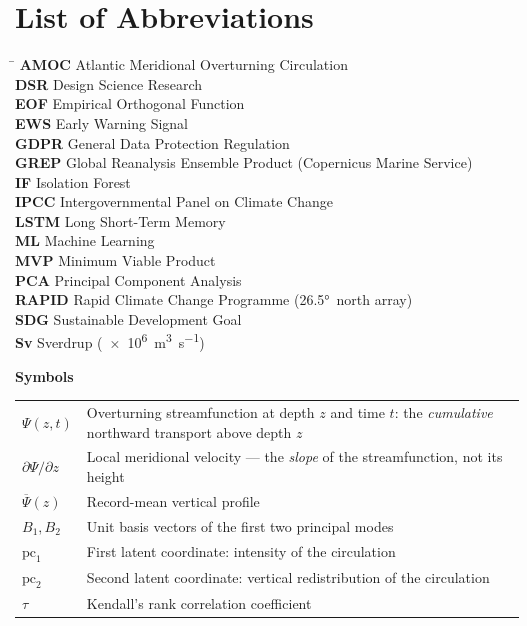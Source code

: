 \chapter*{List of Abbreviations}

\begin{tabbing}
\hspace{3.5cm} \= \kill
\textbf{AMOC} \> Atlantic Meridional Overturning Circulation \\
\textbf{DSR} \> Design Science Research \\
\textbf{EOF} \> Empirical Orthogonal Function \\
\textbf{EWS} \> Early Warning Signal \\
\textbf{GDPR} \> General Data Protection Regulation \\
\textbf{GREP} \> Global Reanalysis Ensemble Product (Copernicus Marine Service) \\
\textbf{IF} \> Isolation Forest \\
\textbf{IPCC} \> Intergovernmental Panel on Climate Change \\
\textbf{LSTM} \> Long Short-Term Memory \\
\textbf{ML} \> Machine Learning \\
\textbf{MVP} \> Minimum Viable Product \\
\textbf{PCA} \> Principal Component Analysis \\
\textbf{RAPID} \> Rapid Climate Change Programme (\ang{26.5}~north array) \\
\textbf{SDG} \> Sustainable Development Goal \\
\textbf{Sv} \> Sverdrup (\SI{e6}{\cubic\metre\per\second}) \\
\end{tabbing}

\vspace{1cm}

\noindent\textbf{Symbols}

\vspace{0.3cm}

\begin{tabularx}{\textwidth}{@{}p{3cm} X@{}}
$\Psi(z,t)$ & Overturning streamfunction at depth $z$ and time $t$: the \emph{cumulative} northward transport above depth $z$ \\[3pt]
$\partial\Psi/\partial z$ & Local meridional velocity --- the \emph{slope} of the streamfunction, not its height \\[3pt]
$\overline{\Psi}(z)$ & Record-mean vertical profile \\[3pt]
$B_1, B_2$ & Unit basis vectors of the first two principal modes \\[3pt]
$\mathrm{pc}_1$ & First latent coordinate: intensity of the circulation \\[3pt]
$\mathrm{pc}_2$ & Second latent coordinate: vertical redistribution of the circulation \\[3pt]
$\tau$ & Kendall's rank correlation coefficient \\
\end{tabularx}

\cleardoublepage
